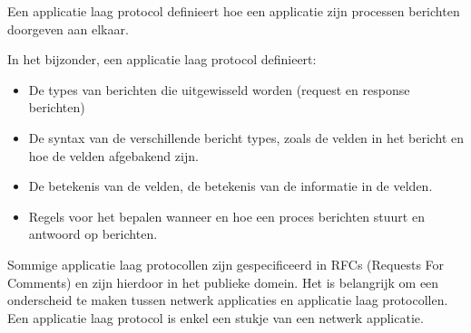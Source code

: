 \noindent Een applicatie laag protocol definieert hoe een applicatie zijn processen berichten doorgeven aan elkaar. 

\noindent In het bijzonder, een applicatie laag protocol definieert:
\begin{itemize}
    \item De types van berichten die uitgewisseld worden (request en response berichten)
    \item De syntax van de verschillende bericht types, zoals de velden in het bericht en hoe de velden afgebakend zijn.
    \item De betekenis van de velden, de betekenis van de informatie in de velden.
    \item Regels voor het bepalen wanneer en hoe een proces berichten stuurt en antwoord op berichten.
\end{itemize}

\noindent Sommige applicatie laag protocollen zijn gespecificeerd in RFCs (Requests For Comments) en zijn hierdoor in het publieke domein. Het is belangrijk om een onderscheid te maken tussen netwerk applicaties en applicatie laag protocollen. Een applicatie laag protocol is enkel een stukje van een netwerk applicatie.
